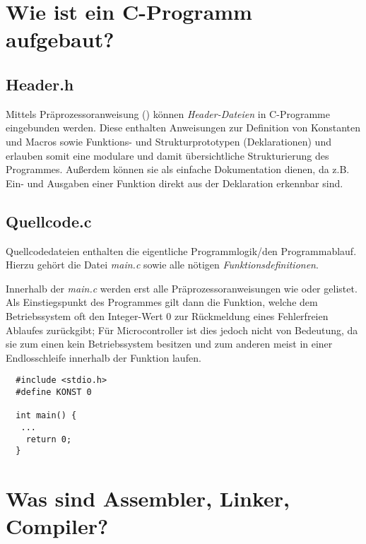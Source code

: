 \documentclass[a4paper, 12pt]{article}
\begin{document}
  
  \clearpage
  \setcounter{page}{1}

  \section{Wie ist ein C-Programm aufgebaut?}

  \subsection{Header.h}
Mittels Präprozessoranweisung () können \emph{Header-Dateien} in
C-Programme eingebunden werden. Diese enthalten  Anweisungen zur
Definition von Konstanten und Macros sowie Funktions- und Strukturprototypen
(Deklarationen) und erlauben somit eine modulare und damit übersichtliche
Strukturierung des Programmes. Außerdem können sie als einfache Dokumentation
dienen, da z.B. Ein- und Ausgaben einer Funktion direkt aus der Deklaration
erkennbar sind.

\subsection{Quellcode.c}
Quellcodedateien enthalten die eigentliche Programmlogik/den Programmablauf. Hierzu gehört die Datei \emph{main.c} sowie alle nötigen \emph{Funktionsdefinitionen}.

Innerhalb der \emph{main.c} werden erst alle Präprozessoranweisungen wie
 oder  gelistet. Als Einstiegspunkt des Programmes gilt dann
die  Funktion, welche dem Betriebssystem oft den Integer-Wert $0$
zur Rückmeldung eines Fehlerfreien Ablaufes zurückgibt; Für Microcontroller ist
dies jedoch nicht von Bedeutung, da sie zum einen kein Betriebssystem besitzen
und zum anderen meist in einer Endlosschleife innerhalb der
Funktion laufen.


\vspace{\parskip}
\begin{lstlisting}
  #include <stdio.h>
  #define KONST 0
  
  int main() {
   ... 
    return 0;
  }
\end{lstlisting}

  \section{Was sind Assembler, Linker, Compiler?}
\end{document}
